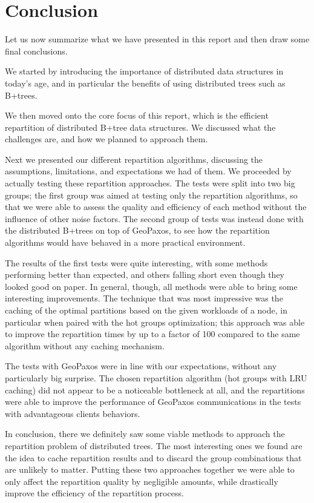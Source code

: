 \chapter{Conclusion}\label{sec:Conclusion}
Let us now summarize what we have presented in this report and then draw some final conclusions.

We started by introducing the importance of distributed data structures in today's age, and in particular the benefits of using distributed trees such as B+trees. 

We then moved onto the core focus of this report, which is the efficient repartition of distributed B+tree data structures. We discussed what the challenges are, and how we planned to approach them.

Next we presented our different repartition algorithms, discussing the assumptions, limitations, and expectations we had of them. We proceeded by actually testing these repartition approaches. The tests were split into two big groups; the first group was aimed at testing only the repartition algorithms, so that we were able to assess the quality and efficiency of each method without the influence of other noise factors. The second group of tests was instead done with the distributed B+trees on top of GeoPaxos, to see how the repartition algorithms would have behaved in a more practical environment.

The results of the first tests were quite interesting, with some methods performing better than expected, and others falling short even though they looked good on paper. In general, though, all methods were able to bring some interesting improvements. The technique that was most impressive was the caching of the optimal partitions based on the given workloads of a node, in particular when paired with the hot groups optimization; this approach was able to improve the repartition times by up to a factor of 100 compared to the same algorithm without any caching mechanism. 

The tests with GeoPaxos were in line with our expectations, without any particularly big surprise. The chosen repartition algorithm (hot groups with LRU caching) did not appear to be a noticeable bottleneck at all, and the repartitions were able to improve the performance of GeoPaxos communications in the tests with advantageous clients behaviors.

In conclusion, there we definitely saw some viable methods to approach the repartition problem of distributed trees. The most interesting ones we found are the idea to cache repartition results and to discard the group combinations that are unlikely to matter. Putting these two approaches together we were able to only affect the repartition quality by negligible amounts, while drastically improve the efficiency of the repartition process.

